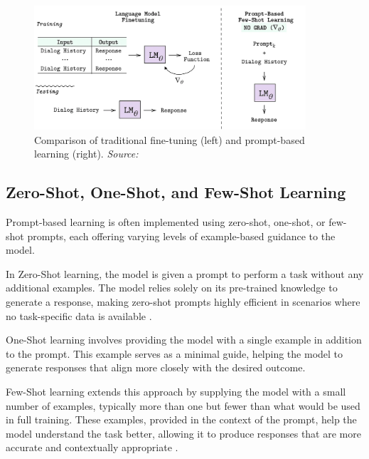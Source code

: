 \begin{figure}[h]
    \centering
    \includegraphics[width=0.9\textwidth]{images/llms/fine-tuning-vs-prompt-learning.png}
    \caption{Comparison of traditional fine-tuning (left) and prompt-based learning (right). \textit{Source:} \cite{madotto2021few}}
    \label{fig:fine_tuning_vs_prompt_learning}
\end{figure}

\subsection{Zero-Shot, One-Shot, and Few-Shot Learning}

Prompt-based learning is often implemented using zero-shot, one-shot, or few-shot prompts, each offering varying levels of example-based guidance to the model.

In Zero-Shot learning, the model is given a prompt to perform a task without any additional examples. The model relies solely on its pre-trained knowledge to generate a response, making zero-shot prompts highly efficient in scenarios where no task-specific data is available \cite{radford2019language}.

One-Shot learning involves providing the model with a single example in addition to the prompt. This example serves as a minimal guide, helping the model to generate responses that align more closely with the desired outcome.

Few-Shot learning extends this approach by supplying the model with a small number of examples, typically more than one but fewer than what would be used in full training. These examples, provided in the context of the prompt, help the model understand the task better, allowing it to produce responses that are more accurate and contextually appropriate \cite{brown2020language}.

